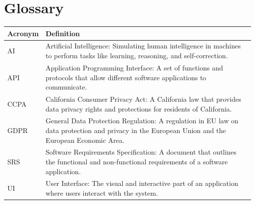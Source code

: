 \documentclass{article}
\begin{document}
\section{Glossary}
\begin{longtable}{|p{3cm}|p{10cm}|}
\hline
\textbf{Acronym} & \textbf{Definition} \\ \hline
AI & Artificial Intelligence: Simulating human intelligence in machines to perform tasks like learning, reasoning, and self-correction. \\ \hline
API & Application Programming Interface: A set of functions and protocols that allow different software applications to communicate. \\ \hline
CCPA & California Consumer Privacy Act: A California law that provides data privacy rights and protections for residents of California. \\ \hline
GDPR & General Data Protection Regulation: A regulation in EU law on data protection and privacy in the European Union and the European Economic Area. \\ \hline
SRS & Software Requirements Specification: A document that outlines the functional and non-functional requirements of a software application. \\ \hline
UI & User Interface: The visual and interactive part of an application where users interact with the system. \\ \hline
\end{longtable}

\printglossaries
\end{document}
